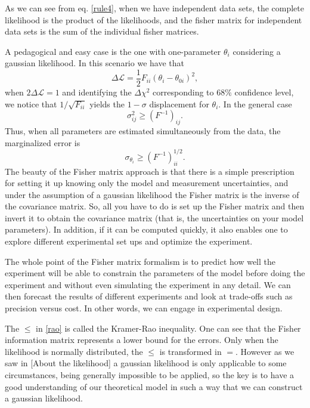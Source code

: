 \documentclass[onecolumn,           %
               showpacs,            %
               preprintnumbers,     %
               aps,                 %
               prl,          	    %
               letterpaper,             %
               superscriptaddress,      %
               nofootinbib,         %
               tightenlines,        %
               floats,floatfix      %
               ,usenatbib,
               ]{revtex4-1}
\begin{document}
As we can see from eq. \eqref{rule4}, when we have independent data sets, the complete likelihood is the product of the likelihoods, and the fisher matrix for independent data sets is the sum of the individual fisher matrices. 

A pedagogical and easy case is the one with one-parameter $\theta_i$ considering a gaussian likelihood. In this scenario we have that
\begin{equation}
\Delta \mathcal{L}=\frac{1}{2}F_{ii}(\theta_i- \theta_{0i})^2,
\end{equation}
when $2\Delta\mathcal{L}=1$ and identifying the $\Delta \chi^2$ corresponding to $68\%$ confidence level, we notice that $1/\sqrt{F_{ii}}$ yields the $1-\sigma$ displacement for $\theta_i$. In the general case
\begin{equation}\label{rao}
\sigma_{ij}^2 \geq (F^{-1})_{ij}.
\end{equation}
Thus, when all parameters are estimated simultaneously from the data, the marginalized error is
\begin{equation}
\sigma_{\theta_i}\geq (F^{-1})^{1/2}_{ii}.
\end{equation}
The beauty of the Fisher matrix approach is that there is a simple prescription for setting it up knowing only the model and measurement uncertainties, and under the assumption of a gaussian likelihood the Fisher matrix is the inverse of the covariance matrix. So, all you have to do is set up the Fisher matrix and then invert it to obtain the covariance matrix (that is, the uncertainties on your model parameters). In addition, if it can be computed quickly, it also enables one to explore different experimental set ups and optimize the experiment.

The whole point of the Fisher matrix formalism is to predict how well the experiment will be able to constrain the parameters of the model before doing the experiment and without even simulating the experiment in any detail. We can then forecast the results of different experiments and look at trade-offs such as precision versus cost. In other words, we can engage in experimental design.

The $\leq$ in \eqref{rao} is called the Kramer-Rao inequality. One can see that the Fisher information matrix represents a lower bound for the errors. Only when the likelihood is normally distributed, the $\leq$ is transformed in $=$. However as we saw in [About the likelihood] a gaussian likelihood is only applicable to some circumstances, being generally impossible to be applied, so the key is to have a good understanding of our theoretical model in such a way that we can construct a gaussian likelihood.
\end{document}
